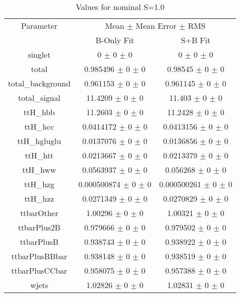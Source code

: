 \begin{table}
\centering
\caption{Values for nominal S=1.0}
\begin{tabular}{ccc}
\toprule
Parameter 	& \multicolumn{2}{c}{Mean $\pm$ Mean Error $\pm$ RMS}\\
 	& B-Only Fit & S+B Fit\\
\midrule
singlet 	& \num{0} $\pm$ \num{0} $\pm$ \num{0} 	& \num{0} $\pm$ \num{0} $\pm$ \num{0}\\
total 	& \num{0.985496} $\pm$ \num{0} $\pm$ \num{0} 	& \num{0.98545} $\pm$ \num{0} $\pm$ \num{0}\\
total\_background 	& \num{0.961153} $\pm$ \num{0} $\pm$ \num{0} 	& \num{0.961145} $\pm$ \num{0} $\pm$ \num{0}\\
total\_signal 	& \num{11.4209} $\pm$ \num{0} $\pm$ \num{0} 	& \num{11.403} $\pm$ \num{0} $\pm$ \num{0}\\
ttH\_hbb 	& \num{11.2603} $\pm$ \num{0} $\pm$ \num{0} 	& \num{11.2428} $\pm$ \num{0} $\pm$ \num{0}\\
ttH\_hcc 	& \num{0.0414172} $\pm$ \num{0} $\pm$ \num{0} 	& \num{0.0413156} $\pm$ \num{0} $\pm$ \num{0}\\
ttH\_hgluglu 	& \num{0.0137076} $\pm$ \num{0} $\pm$ \num{0} 	& \num{0.0136856} $\pm$ \num{0} $\pm$ \num{0}\\
ttH\_htt 	& \num{0.0213667} $\pm$ \num{0} $\pm$ \num{0} 	& \num{0.0213379} $\pm$ \num{0} $\pm$ \num{0}\\
ttH\_hww 	& \num{0.0563937} $\pm$ \num{0} $\pm$ \num{0} 	& \num{0.056268} $\pm$ \num{0} $\pm$ \num{0}\\
ttH\_hzg 	& \num{0.000500874} $\pm$ \num{0} $\pm$ \num{0} 	& \num{0.000500261} $\pm$ \num{0} $\pm$ \num{0}\\
ttH\_hzz 	& \num{0.0271349} $\pm$ \num{0} $\pm$ \num{0} 	& \num{0.0270829} $\pm$ \num{0} $\pm$ \num{0}\\
ttbarOther 	& \num{1.00296} $\pm$ \num{0} $\pm$ \num{0} 	& \num{1.00321} $\pm$ \num{0} $\pm$ \num{0}\\
ttbarPlus2B 	& \num{0.979666} $\pm$ \num{0} $\pm$ \num{0} 	& \num{0.979502} $\pm$ \num{0} $\pm$ \num{0}\\
ttbarPlusB 	& \num{0.938743} $\pm$ \num{0} $\pm$ \num{0} 	& \num{0.938922} $\pm$ \num{0} $\pm$ \num{0}\\
ttbarPlusBBbar 	& \num{0.938148} $\pm$ \num{0} $\pm$ \num{0} 	& \num{0.938519} $\pm$ \num{0} $\pm$ \num{0}\\
ttbarPlusCCbar 	& \num{0.958075} $\pm$ \num{0} $\pm$ \num{0} 	& \num{0.957388} $\pm$ \num{0} $\pm$ \num{0}\\
wjets 	& \num{1.02826} $\pm$ \num{0} $\pm$ \num{0} 	& \num{1.02831} $\pm$ \num{0} $\pm$ \num{0}\\
\bottomrule
\end{tabular}
\end{table}